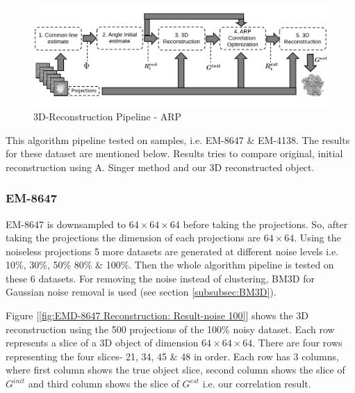 \documentclass{report}
\begin{document}
\begin{figure}[H]
\includegraphics[width=1\textwidth]{3d-reconstrction-pipepline-ARP.png}
\centering
\captionsetup{justification=centering}
\caption{3D-Reconstruction Pipeline - ARP }
\label{fig:3D-Reconstruction Pipeline-ARP}
\end{figure}

This algorithm pipeline tested on samples, i.e. EM-8647 \& EM-4138. The results for these dataset are mentioned below. Results tries to compare original, initial reconstruction using A. Singer method and our 3D reconstructed object. 

\subsubsection{EM-8647}

EM-8647 is downsampled to $64\times64\times64$ before taking the projections. So, after taking the projections the dimension of each projections are $64\times64$. Using the noiseless projections 5 more datasets are generated at different noise levels i.e. 10\%, 30\%, 50\% 80\% \& 100\%. Then the whole algorithm pipeline is tested on these 6 datasets. For removing the noise instead of clustering, BM3D for Gaussian noise removal is used (see section \ref{subsubsec:BM3D}).

Figure [\ref{fig:EMD-8647 Reconstruction: Result-noise 100}] shows the 3D reconstruction using the 500 projections of the 100\% noisy dataset. Each row represents a slice of a 3D object of dimension $64\times64\times64$. There are four rows representing the  four slices- 21, 34, 45 \& 48 in order. Each row has 3 columns, where first column shows the true object slice, second column shows the slice of $G^{init}$ and third column shows the slice of $G^{est}$ i.e. our correlation result. 
\end{document}
